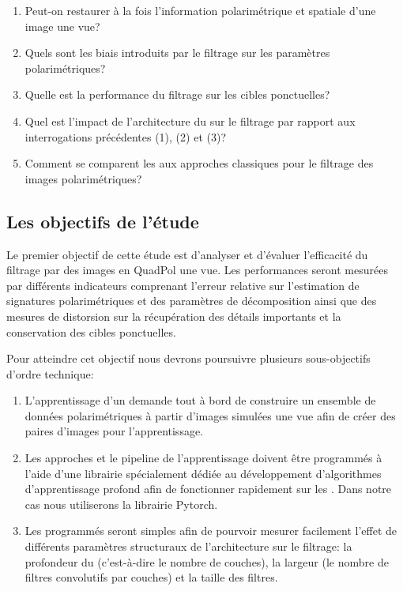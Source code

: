 \begin{enumerate}
    \item Peut-on restaurer à la fois l'information polarimétrique et spatiale d'une image  \acrpolsar une vue?
    \item Quels sont les biais introduits par le filtrage sur les paramètres polarimétriques?
    \item Quelle est la performance du filtrage sur les cibles ponctuelles?
    \item Quel est l'impact de l'architecture du \acrconvnet sur le filtrage par rapport aux interrogations précédentes (1), (2) et (3)?
    \item Comment se comparent les \acrconvnet aux approches classiques pour le filtrage des images polarimétriques?
\end{enumerate}

\subsection{Les objectifs de l'étude}

Le premier objectif de cette étude est d'analyser et d'évaluer l'efficacité du filtrage par \acrconvnet  des images en QuadPol une vue.  Les performances seront mesurées par différents indicateurs comprenant l'erreur relative sur l'estimation de signatures polarimétriques et des paramètres de décomposition ainsi que des mesures de distorsion sur la récupération des détails importants et la conservation des cibles ponctuelles. 

Pour atteindre cet objectif nous devrons poursuivre plusieurs sous-objectifs d'ordre technique:
\begin{enumerate}
\item L'apprentissage d'un \acrconvnet demande tout à bord de construire un ensemble de données polarimétriques à partir d'images simulées une vue afin de créer des paires d'images pour l'apprentissage.
\item Les approches \acrconvnet et le pipeline de l'apprentissage doivent être programmés à l'aide d'une librairie spécialement dédiée au développement d'algorithmes d'apprentissage profond afin de fonctionner rapidement sur les \acrgpu.  Dans notre cas nous utiliserons la librairie Pytorch.
\item Les  \acrconvnet programmés seront simples afin de pourvoir mesurer facilement l'effet de différents paramètres structuraux de l'architecture sur le filtrage: la profondeur du \acrconvnet (c'est-à-dire le nombre de couches), la largeur (le nombre de filtres convolutifs par couches) et la taille des filtres.
\end{enumerate}

